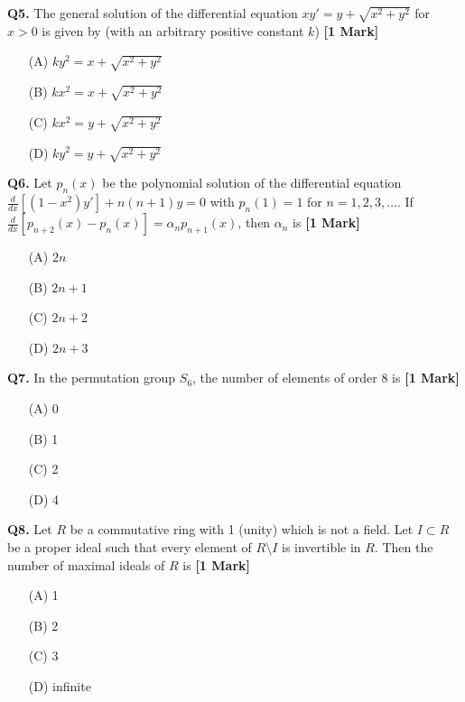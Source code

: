 \documentclass[11pt]{article}
\newcommand{\questiona}[2]{
    \noindent\textbf{Q#2.} #1 \hfill \textbf{[1 Mark]}
}
\begin{document}
\questiona{The general solution of the differential equation \( x y' = y + \sqrt{x^2 + y^2} \) for \( x > 0 \) is given by (with an arbitrary positive constant \( k \))}{5}
\begin{enumerate}
    \item[(A)] \( k y^2 = x + \sqrt{x^2 + y^2} \)
    \item[(B)] \( k x^2 = x + \sqrt{x^2 + y^2} \)
    \item[(C)] \( k x^2 = y + \sqrt{x^2 + y^2} \)
    \item[(D)] \( k y^2 = y + \sqrt{x^2 + y^2} \)
\end{enumerate}
\vspace{0.5cm}

\questiona{Let \( p_n(x) \) be the polynomial solution of the differential equation \( \frac{d}{dx} \left[(1 - x^2) y' \right] + n(n + 1)y = 0 \) with \( p_n(1) = 1 \) for \( n = 1, 2, 3, \ldots \). If \( \frac{d}{dx}[p_{n+2}(x) - p_n(x)] = \alpha_n p_{n+1}(x) \), then \( \alpha_n \) is}{6}
\begin{enumerate}
    \item[(A)] \( 2n \)
    \item[(B)] \( 2n + 1 \)
    \item[(C)] \( 2n + 2 \)
    \item[(D)] \( 2n + 3 \)
\end{enumerate}
\vspace{0.5cm}

\questiona{In the permutation group \( S_6 \), the number of elements of order 8 is}{7}
\begin{enumerate}
    \item[(A)] 0
    \item[(B)] 1
    \item[(C)] 2
    \item[(D)] 4
\end{enumerate}
\vspace{0.5cm}

\questiona{Let \( R \) be a commutative ring with 1 (unity) which is not a field. Let \( I \subset R \) be a proper ideal such that every element of \( R \setminus I \) is invertible in \( R \). Then the number of maximal ideals of \( R \) is}{8}
\begin{enumerate}
    \item[(A)] 1
    \item[(B)] 2
    \item[(C)] 3
    \item[(D)] infinite
\end{enumerate}
\vspace{0.5cm}
\end{document}
